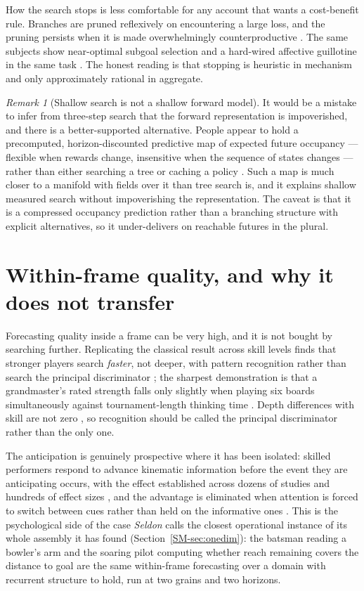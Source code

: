 \documentclass[11pt,a4paper]{article}
\theoremstyle{remark}
\newtheorem{remark}{Remark}[section]
\begin{document}
How the search stops is less comfortable for any account that wants a cost-benefit rule. Branches are
pruned reflexively on encountering a large loss, and the pruning persists when it is made
overwhelmingly counterproductive \citep{huys2012}. The same subjects show near-optimal subgoal
selection and a hard-wired affective guillotine in the same task \citep{huys2015}. The honest reading
is that stopping is heuristic in mechanism and only approximately rational in aggregate.

\begin{remark}[Shallow search is not a shallow forward model]\label{rem:sr}
It would be a mistake to infer from three-step search that the forward representation is
impoverished, and there is a better-supported alternative. People appear to hold a precomputed,
horizon-discounted predictive map of expected future occupancy --- flexible when rewards change,
insensitive when the sequence of states changes --- rather than either searching a tree or caching a
policy \citep{momennejad2017}. Such a map is much closer to a manifold with fields over it than tree
search is, and it explains shallow measured search without impoverishing the representation. The
caveat is that it is a compressed occupancy prediction rather than a branching structure with
explicit alternatives, so it under-delivers on reachable futures in the plural.
\end{remark}

\section{Within-frame quality, and why it does not transfer}\label{sec:expertise}
Forecasting quality inside a frame can be very high, and it is not bought by searching further.
Replicating the classical result across skill levels finds that stronger players search
\emph{faster}, not deeper, with pattern recognition rather than search the principal discriminator
\citep{degroot1965,connors2011}; the sharpest demonstration is that a grandmaster's rated strength
falls only slightly when playing six boards simultaneously against tournament-length thinking time
\citep{gobetsimon1996ps}. Depth differences with skill are not zero \citep{campitelli2004}, so
recognition should be called the principal discriminator rather than the only one.

The anticipation is genuinely prospective where it has been isolated: skilled performers respond to
advance kinematic information before the event they are anticipating occurs, with the effect
established across dozens of studies and hundreds of effect sizes \citep{muller2006,mann2007}, and
the advantage is eliminated when attention is forced to switch between cues rather than held on the
informative ones \citep{muller2010}. This is the psychological side of the case \emph{Seldon} calls
the closest operational instance of its whole assembly it has found (Section~\ref{SM-sec:onedim}):
the batsman reading a bowler's arm and the soaring pilot computing whether reach remaining covers
the distance to goal are the same within-frame forecasting over a domain with recurrent structure to
hold, run at two grains and two horizons.
\end{document}
